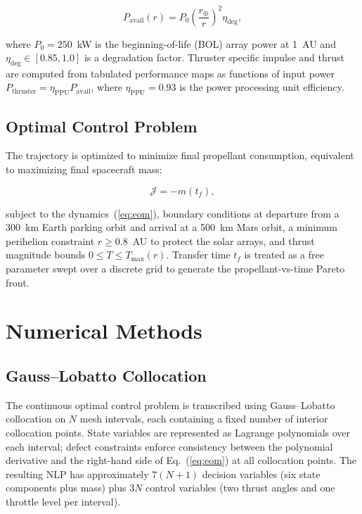 \documentclass{aiaa-tc}
\begin{document}
\begin{equation}
  P_{\text{avail}}(r) = P_0 \left(\frac{r_\oplus}{r}\right)^{2} \eta_{\text{deg}},
  \label{eq:power}
\end{equation}

\noindent where $P_0 = 250$~kW is the beginning-of-life (BOL) array power at 1~AU
and $\eta_{\text{deg}} \in [0.85, 1.0]$ is a degradation factor.  Thruster
specific impulse and thrust are computed from tabulated performance maps as
functions of input power $P_{\text{thruster}} = \eta_{\text{PPU}} P_{\text{avail}}$,
where $\eta_{\text{PPU}} = 0.93$ is the power processing unit efficiency.

\subsection{Optimal Control Problem}

The trajectory is optimized to minimize final propellant consumption, equivalent
to maximizing final spacecraft mass:

\begin{equation}
  \mathcal{J} = -m(t_f),
  \label{eq:cost}
\end{equation}

subject to the dynamics~(\ref{eq:eom}), boundary conditions at departure from
a 300~km Earth parking orbit and arrival at a 500~km Mars orbit, a minimum
perihelion constraint $r \geq 0.8$~AU to protect the solar arrays, and thrust
magnitude bounds $0 \leq T \leq T_{\max}(r)$.  Transfer time $t_f$ is treated
as a free parameter swept over a discrete grid to generate the propellant-vs-time
Pareto front.

\section{Numerical Methods}
\label{sec:methods}

\subsection{Gauss--Lobatto Collocation}

The continuous optimal control problem is transcribed using Gauss–Lobatto
collocation on $N$ mesh intervals, each containing a fixed number of interior
collocation points.  State variables are represented as Lagrange polynomials
over each interval; defect constraints enforce consistency between the polynomial
derivative and the right-hand side of Eq.~(\ref{eq:eom}) at all collocation
points.  The resulting NLP has approximately $7(N+1)$ decision variables (six
state components plus mass) plus $3N$ control variables (two thrust angles and
one throttle level per interval).
\end{document}
